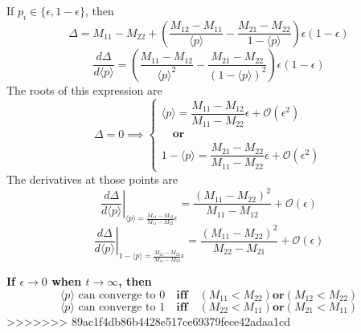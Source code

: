 \documentclass[a4paper]{article}
\newcommand{\ep}{\langle p \rangle}
\newcommand{\ord}{\mathcal{O}}
\begin{document}
If $p_i\in\{\epsilon,1-\epsilon\}$, then
\begin{equation}
	\Delta = M_{11} - M_{22} 
	+ \left(\frac{M_{12}-M_{11}}{\ep} - \frac{M_{21}-M_{22}}{1-\ep}\right)
	\epsilon(1-\epsilon)
\end{equation}
\begin{equation}
	\frac{d\Delta}{d\ep} = 
	\left(\frac{M_{11}-M_{12}}{\ep^2} - \frac{M_{21}-M_{22}}{(1-\ep)^2}\right)\epsilon(1-\epsilon)
\end{equation}
The roots of this expression are
\begin{equation}
	\Delta = 0 \implies 
	\begin{cases}
		\ep = \dfrac{M_{11}-M_{12}}{M_{11}-M_{22}}\epsilon 
			  + \ord(\epsilon^2)\\
		\quad \textbf{or}\\
		1 - \ep = \dfrac{M_{21}-M_{22}}{M_{11}-M_{22}}\epsilon
			  	  + \ord(\epsilon^2)
	\end{cases}
\end{equation}
The derivatives at those points are
\begin{equation}
	\left.\frac{d\Delta}{d\ep}\right|_{\ep = \frac{M_{11}-M_{12}}{M_{11}-M_{22}}\epsilon}
	= \frac{(M_{11}-M_{22})^2}{M_{11}-M_{12}} + \ord(\epsilon)
\end{equation}
\begin{equation}
	\left.\frac{d\Delta}{d\ep}\right|_{1-\ep = \frac{M_{21}-M_{22}}{M_{11}-M_{22}}\epsilon}
	= \frac{(M_{11}-M_{22})^2}{M_{22}-M_{21}} + \ord(\epsilon)
\end{equation}

\textbf{If $\epsilon\rightarrow0$ when $t\rightarrow\infty$, then} 
\begin{equation}
	\ep \text{ can converge to 0} \quad\textbf{iff}\quad (M_{11}<M_{22})\textbf{or}(M_{12}<M_{22})
\end{equation}
\begin{equation}
	\ep \text{ can converge to 1} \quad\textbf{iff}\quad (M_{22}<M_{11})\textbf{or}(M_{21}<M_{11})
\end{equation}
>>>>>>> 89ac1f4db86b4428e517ce69379fece42adaa1cd
\end{document}

